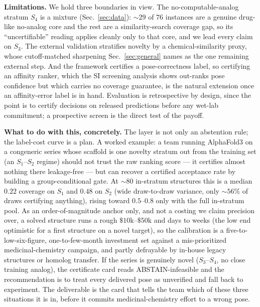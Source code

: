 \documentclass[10pt]{article}
\begin{document}
\textbf{Limitations.} We hold three boundaries in view. The no-computable-analog stratum $S_4$ is a mixture
(Sec.~\ref{sec:data}): $\sim\!29$ of $76$ instances are a genuine drug-like no-analog core and the rest are
a similarity-search coverage gap, so its ``uncertifiable'' reading applies cleanly only to that core, and
we lead every claim on $S_3$. The external validation stratifies novelty by a chemical-similarity proxy, whose cutoff-matched sharpening
Sec.~\ref{sec:general} names as the one remaining external step.
And the framework certifies a pose-correctness label, so certifying an affinity ranker, which the SI
screening analysis shows out-ranks pose confidence but which carries no coverage guarantee, is the natural
extension once an affinity-error label is in hand. Evaluation is retrospective by design, since the point
is to certify decisions on released predictions before any wet-lab commitment; a prospective screen is the
direct test of the payoff.

\textbf{What to do with this, concretely.} The layer is not only an abstention rule; the label-cost curve
is a plan. A worked example: a team running AlphaFold3 on a congeneric series whose scaffold is one novelty
stratum out from the training set (an $S_1$--$S_2$ regime) should not trust the raw ranking score --- it
certifies almost nothing there leakage-free --- but can recover a certified acceptance rate by building a group-conditional gate. At $\sim\!80$ in-stratum
structures this is a median $0.22$ coverage on $S_1$ and $0.48$ on $S_2$ (wide draw-to-draw variance, only
$\sim\!56\%$ of draws certifying anything), rising toward $0.5$--$0.8$ only with the full in-stratum pool. As an order-of-magnitude anchor only, and not a costing we claim precision over, a solved
structure runs a rough $\$10$k--$\$50$k and days to weeks (the low end optimistic for a first structure on a
novel target), so the calibration is a five-to-low-six-figure, one-to-few-month investment set against a
mis-prioritized medicinal-chemistry campaign, and partly defrayable by in-house legacy structures or
homolog transfer. If the series is genuinely novel
($S_3$--$S_4$, no close training analog), the certificate card
reads ABSTAIN-infeasible and the recommendation is to treat every delivered pose as unverified and
fall back to experiment. The deliverable is the card that tells the team which of these three situations it
is in, before it commits medicinal-chemistry effort to a wrong pose.
\end{document}
